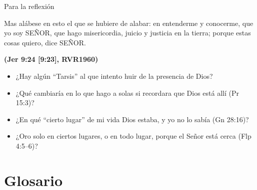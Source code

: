 \documentclass[hyperref={bookmarks=false},aspectratio=169]{beamer}
\newcommand{\SENOR}{S{\fontsize{0.78em}{1em}\selectfont EÑOR}}
\newcommand{\fuente}[1]{\par\hfill{\upshape\bfseries\footnotesize\textcolor{azul}{#1}}}
\begin{document}
\begin{frame}{Para la reflexión}
\begin{cita}Mas alábese en esto el que se hubiere de alabar: en entenderme y conocerme, que yo soy \SENOR, que hago misericordia, juicio y justicia en la tierra; porque estas cosas quiero, dice \SENOR.\fuente{(Jer 9:24 [9:23], RVR1960)}\end{cita}
\small
\begin{itemize}
\item ¿Hay algún ``Tarsis'' al que intento huir de la presencia de Dios?
\item ¿Qué cambiaría en lo que hago a solas si recordara que Dios está allí (Pr 15:3)?
\item ¿En qué ``cierto lugar'' de mi vida Dios estaba, y yo no lo sabía (Gn 28:16)?
\item ¿Oro solo en ciertos lugares, o en todo lugar, porque el Señor está cerca (Flp 4:5--6)?
\end{itemize}
\end{frame}

\section{Glosario}
\end{document}
